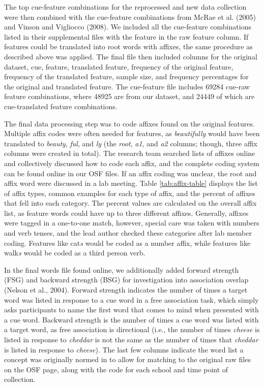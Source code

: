 \documentclass[english,,man]{apa6}
\begin{document}
The top cue-feature combinations for the reprocessed and new data collection were then combined with the cue-feature combinations from McRae et al. (2005) and Vinson and Vigliocco (2008). We included all the cue-feature combinations listed in their supplemental files with the feature in the raw feature column. If features could be translated into root words with affixes, the same procedure as described above was applied. The final file then included columns for the original dataset, cue, feature, translated feature, frequency of the original feature, frequency of the translated feature, sample size, and frequency percentages for the original and translated feature. The cue-feature file includes 69284 cue-raw feature combinations, where 48925 are from our dataset, and 24449 of which are cue-translated feature combinations.

The final data processing step was to code affixes found on the original features. Multiple affix codes were often needed for features, as \emph{beautifully} would have been translated to \emph{beauty}, \emph{ful}, and \emph{ly} (the \emph{root}, \emph{a1}, and \emph{a2} columns; though, three affix columns were created in total). The research team searched lists of affixes online and collectively discussed how to code each affix, and the complete coding system can be found online in our OSF files. If an affix coding was unclear, the root and affix word were discussed in a lab meeting. Table \ref{tab:affix-table} displays the list of affix types, common examples for each type of affix, and the percent of affixes that fell into each category. The percent values are calculated on the overall affix list, as feature words could have up to three different affixes. Generally, affixes were tagged in a one-to-one match, however, special care was taken with numbers and verb tenses, and the lead author checked these categories after lab member coding. Features like cat\emph{s} would be coded as a number affix, while features like walk\emph{s} would be coded as a third person verb.

In the final words file found online, we additionally added forward strength (FSG) and backward strength (BSG) for investigation into association overlap (Nelson et al., 2004). Forward strength indicates the number of times a target word was listed in response to a cue word in a free association task, which simply asks participants to name the first word that comes to mind when presented with a cue word. Backward strength is the number of times a cue word was listed with a target word, as free association is directional (i.e., the number of times \emph{cheese} is listed in response to \emph{cheddar} is not the same as the number of times that \emph{cheddar} is listed in response to \emph{cheese}). The last few columns indicate the word list a concept was originally normed in to allow for matching to the original raw files on the OSF page, along with the code for each school and time point of collection.
\end{document}
